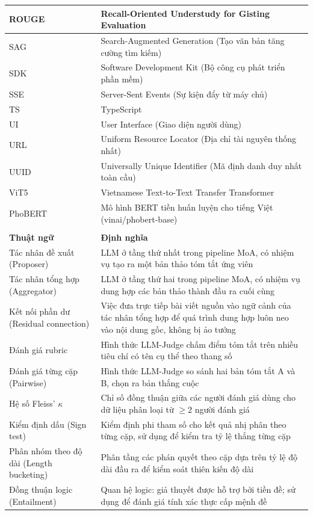 \begin{longtable}{|>{\raggedright\arraybackslash}p{3.6cm}|>{\raggedright\arraybackslash}p{10.4cm}|}
  ROUGE & Recall-Oriented Understudy for Gisting Evaluation \\ \hline
  SAG   & Search-Augmented Generation (Tạo văn bản tăng cường tìm kiếm) \\ \hline
  SDK   & Software Development Kit (Bộ công cụ phát triển phần mềm) \\ \hline
  SSE   & Server-Sent Events (Sự kiện đẩy từ máy chủ) \\ \hline
  TS    & TypeScript \\ \hline
  UI    & User Interface (Giao diện người dùng) \\ \hline
  URL   & Uniform Resource Locator (Địa chỉ tài nguyên thống nhất) \\ \hline
  UUID  & Universally Unique Identifier (Mã định danh duy nhất toàn cầu) \\ \hline
  ViT5  & Vietnamese Text-to-Text Transfer Transformer \\ \hline
  PhoBERT & Mô hình BERT tiền huấn luyện cho tiếng Việt (vinai/phobert-base) \\ \hline
  \multicolumn{2}{l}{} \\
  \hline
  \textbf{Thuật ngữ} & \textbf{Định nghĩa} \\ \hline
  Tác nhân đề xuất (Proposer)    & LLM ở tầng thứ nhất trong pipeline MoA, có nhiệm vụ tạo ra một bản thảo tóm tắt ứng viên \\ \hline
  Tác nhân tổng hợp (Aggregator)  & LLM ở tầng thứ hai trong pipeline MoA, có nhiệm vụ dung hợp các bản thảo thành đầu ra cuối cùng \\ \hline
  Kết nối phần dư (Residual connection) & Việc đưa trực tiếp bài viết nguồn vào ngữ cảnh của tác nhân tổng hợp để quá trình dung hợp luôn neo vào nội dung gốc, không bị ảo tưởng \\ \hline
  Đánh giá rubric   & Hình thức LLM-Judge chấm điểm tóm tắt trên nhiều tiêu chí có tên cụ thể theo thang số \\ \hline
  Đánh giá từng cặp (Pairwise) & Hình thức LLM-Judge so sánh hai bản tóm tắt A và B, chọn ra bản thắng cuộc \\ \hline
  Hệ số Fleiss' $\kappa$ & Chỉ số đồng thuận giữa các người đánh giá dùng cho dữ liệu phân loại từ $\geq 2$ người đánh giá \\ \hline
  Kiểm định dấu (Sign test)        & Kiểm định phi tham số cho kết quả nhị phân theo từng cặp, sử dụng để kiểm tra tỷ lệ thắng từng cặp \\ \hline
  Phân nhóm theo độ dài (Length bucketing) & Phân tầng các phán quyết theo cặp dựa trên tỷ lệ độ dài đầu ra để kiểm soát thiên kiến độ dài \\ \hline
  Đồng thuận logic (Entailment)       & Quan hệ logic: giả thuyết được hỗ trợ bởi tiền đề; sử dụng để đánh giá tính xác thực cấp mệnh đề \\ \hline
\end{longtable}

